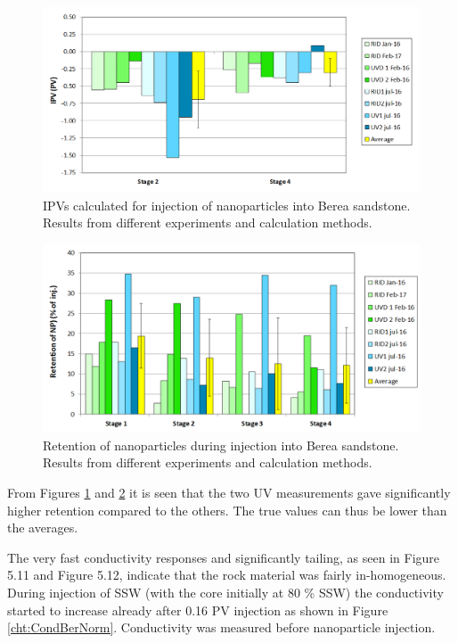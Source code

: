 \begin{figure}[h!]
    \centering
    \includegraphics[width=\textwidth]{img/cht/IPVber.png}
    \caption{IPVs calculated for injection of nanoparticles into Berea sandstone. Results from different experiments and calculation methods.}
    \label{cht:IPVber}
\end{figure}

\begin{figure}[h!]
    \centering
    \includegraphics[width=\textwidth]{img/cht/retentionBer.png}
    \caption{Retention of nanoparticles during injection into Berea sandstone. Results from different experiments and calculation methods.}
    \label{cht:retentionBer} %
\end{figure}

From Figures \ref{cht:IPVber} and \ref{cht:retentionBer} it is seen that the two UV measurements gave significantly higher retention compared to the others. The true values can thus be lower than the averages.

The very fast conductivity responses and significantly tailing, as seen in Figure 5.11 and Figure 5.12, indicate that the rock material was fairly in-homogeneous. During injection of SSW (with the core initially at 80 \% SSW) the conductivity started to increase already after 0.16 PV injection as shown in Figure \ref{cht:CondBerNorm}. Conductivity was measured before nanoparticle injection.

